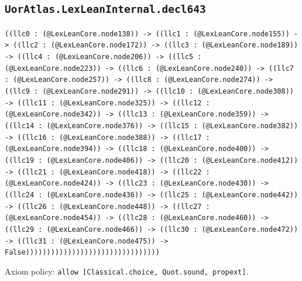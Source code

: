 \documentclass[11pt]{article}
\begin{document}
\subsection*{\texttt{UorAtlas.LexLeanInternal.decl643}}
\noindent\texttt{((llc0 : (@LexLeanCore.node138)) -> ((llc1 : (@LexLeanCore.node155)) -> ((llc2 : (@LexLeanCore.node172)) -> ((llc3 : (@LexLeanCore.node189)) -> ((llc4 : (@LexLeanCore.node206)) -> ((llc5 : (@LexLeanCore.node223)) -> ((llc6 : (@LexLeanCore.node240)) -> ((llc7 : (@LexLeanCore.node257)) -> ((llc8 : (@LexLeanCore.node274)) -> ((llc9 : (@LexLeanCore.node291)) -> ((llc10 : (@LexLeanCore.node308)) -> ((llc11 : (@LexLeanCore.node325)) -> ((llc12 : (@LexLeanCore.node342)) -> ((llc13 : (@LexLeanCore.node359)) -> ((llc14 : (@LexLeanCore.node376)) -> ((llc15 : (@LexLeanCore.node382)) -> ((llc16 : (@LexLeanCore.node388)) -> ((llc17 : (@LexLeanCore.node394)) -> ((llc18 : (@LexLeanCore.node400)) -> ((llc19 : (@LexLeanCore.node406)) -> ((llc20 : (@LexLeanCore.node412)) -> ((llc21 : (@LexLeanCore.node418)) -> ((llc22 : (@LexLeanCore.node424)) -> ((llc23 : (@LexLeanCore.node430)) -> ((llc24 : (@LexLeanCore.node436)) -> ((llc25 : (@LexLeanCore.node442)) -> ((llc26 : (@LexLeanCore.node448)) -> ((llc27 : (@LexLeanCore.node454)) -> ((llc28 : (@LexLeanCore.node460)) -> ((llc29 : (@LexLeanCore.node466)) -> ((llc30 : (@LexLeanCore.node472)) -> ((llc31 : (@LexLeanCore.node475)) -> False))))))))))))))))))))))))))))))))}\par
\noindent Axiom policy: \texttt{allow [Classical.choice, Quot.sound, propext]}.\par
\end{document}
